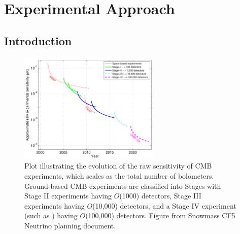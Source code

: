  
\chapter{Experimental Approach}

\def\nnu{N_{\mathrm eff}}
\def\gtrsim{\raise-.75ex\hbox{$\buildrel>\over\sim$}}

\section{Introduction}


\begin{figure}[!h]
\centering \includegraphics[width=0.6\textwidth]{Intro/expt_progress.pdf}
\caption{Plot illustrating the evolution of the raw sensitivity of CMB
  experiments, which scales as the total number of
  bolometers. Ground-based CMB experiments are classified into Stages
  with Stage II experiments having $O$(1000) detectors, Stage III
  experiments having $O$(10,000) detectors, and a Stage IV experiment
  (such as \cmbexp) having $O$(100,000) detectors. Figure from Snowmass  CF5
  Neutrino planning document.}
\label{fig:expt_progress}
\end{figure}

